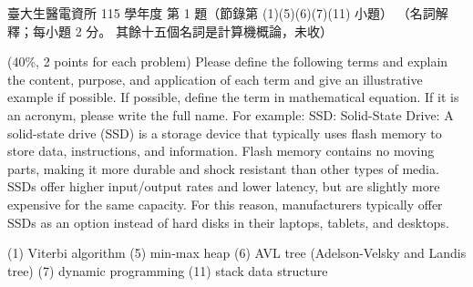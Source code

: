 \begin{pastexam}[label={px:ntu-115-bmei-alg-01}]{臺大生醫電資所 115 學年度 第 1 題（節錄第 (1)(5)(6)(7)(11) 小題）}
（名詞解釋；每小題 2 分。 其餘十五個名詞是計算機概論，未收）

(40\%, 2 points for each problem) Please define the following terms and explain the content,
purpose, and application of each term and give an illustrative example if possible. If possible,
define the term in mathematical equation. If it is an acronym, please write the full name. For
example: SSD: Solid-State Drive: A solid-state drive (SSD) is a storage device that typically uses
flash memory to store data, instructions, and information. Flash memory contains no moving parts,
making it more durable and shock resistant than other types of media. SSDs offer higher
input/output rates and lower latency, but are slightly more expensive for the same capacity. For
this reason, manufacturers typically offer SSDs as an option instead of hard disks in their
laptops, tablets, and desktops.

(1) Viterbi algorithm \quad (5) min-max heap \quad (6) AVL tree (Adelson-Velsky and Landis tree)
\quad (7) dynamic programming \quad (11) stack data structure
\end{pastexam}

